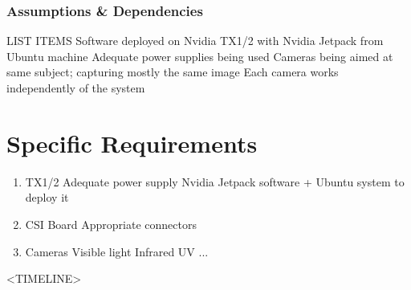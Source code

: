 \documentclass[]{report}
\begin{document}
\subsubsection{Assumptions \& Dependencies}
LIST ITEMS
Software deployed on Nvidia TX1/2 with Nvidia Jetpack from Ubuntu machine
Adequate power supplies being used
Cameras being aimed at same subject; capturing mostly the same image
Each camera works independently of the system

\section{Specific Requirements}
\begin{enumerate}
	\item TX1/2
		\subitem Adequate power supply
		\subitem Nvidia Jetpack software + Ubuntu system to deploy it
	\item CSI Board
		\subitem Appropriate connectors
	\item Cameras
		\subitem Visible light
		\subitem Infrared
		\subitem UV
		\subitem ...
\end{enumerate}

<TIMELINE>
\end{document}
